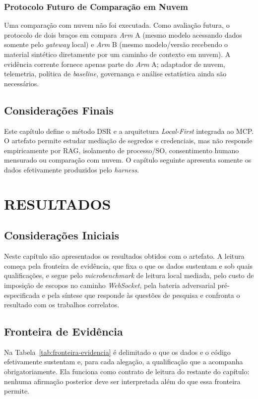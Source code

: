 \documentclass[12pt,openright,twoside,a4paper,english,brazil]{abntex2}
\begin{document}
\subsection{Protocolo Futuro de Comparação em Nuvem}
Uma comparação com nuvem não foi executada. Como avaliação futura, o protocolo de dois braços em  compara \textit{Arm} A (mesmo modelo acessando dados somente pelo \textit{gateway} local) e \textit{Arm} B (mesmo modelo/versão recebendo o material sintético diretamente por um caminho de contexto em nuvem). A evidência corrente fornece apenas parte do \textit{Arm} A; adaptador de nuvem, telemetria, política de \textit{baseline}, governança e análise estatística ainda são necessários.

\section{Considerações Finais}
Este capítulo define o método DSR e a arquitetura \textit{Local-First} integrada ao MCP. O artefato permite estudar mediação de segredos e credenciais, mas não responde empiricamente por RAG, isolamento de processo/SO, consentimento humano mensurado ou comparação com nuvem. O capítulo seguinte apresenta somente os dados efetivamente produzidos pelo \textit{harness}.

\chapter{RESULTADOS}
\section{Considerações Iniciais}
Neste capítulo são apresentados os resultados obtidos com o artefato. A leitura começa pela fronteira de evidência, que fixa o que os dados sustentam e sob quais qualificações, e segue pelo \textit{microbenchmark} de leitura local mediada, pelo custo de imposição de escopos no caminho \textit{WebSocket}, pela bateria adversarial pré-especificada e pela síntese que responde às questões de pesquisa e confronta o resultado com os trabalhos correlatos.

\section{Fronteira de Evidência}
\label{sec:fronteira-evidencia}
Na Tabela~\ref{tab:fronteira-evidencia} é delimitado o que os dados e o código efetivamente sustentam e, para cada alegação, a qualificação que a acompanha obrigatoriamente. Ela funciona como contrato de leitura do restante do capítulo: nenhuma afirmação posterior deve ser interpretada além do que essa fronteira permite.
\end{document}
